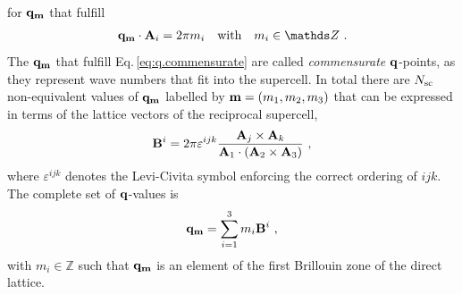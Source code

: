 for ${\bf q}_{{\bf m}}$ that fulfill
\begin{align}
	{\bf q_{\b m}} \cdot {\bf A}_i	= 2 \pi m_i \quad\text{with}\quad m_i \in \mathds Z~.
	\label{eq:q.commensurate}
\end{align}
The ${\bf q}_{{\bf m}}$ that fulfill Eq.\,\eqref{eq:q.commensurate} are called \emph{commensurate} ${\bf q}$-points, as they represent wave numbers that fit into the supercell.
In total there are $N_{\rm sc}$ non-equivalent values of $\bf q_{{\bf m}}$ labelled by ${\bf m} = (m_1, m_2, m_3)$ that can be expressed in terms of the lattice vectors of the reciprocal supercell,
\begin{align}
{\bf B}^i 
= 2 \pi \varepsilon^{ijk} \frac{{\bf A}_j \times {\bf A}_k}{{\bf A}_1 \cdot ({\bf A}_2 \times {\bf A}_3)} ~,
\end{align}
where $\varepsilon^{ijk}$ denotes the Levi-Civita symbol enforcing the correct ordering of $ijk$. The complete set of $\bf q$-values is
\begin{align}
{\bf q}_{\bf m} 
= \sum_{i=1}^3 m_i {\bf B}^i~,
\label{eq:q_m}
\end{align}
with $m_i \in \mathds Z$ such that ${\bf q}_{\bf m}$ is an element of the first Brillouin zone of the direct lattice.


